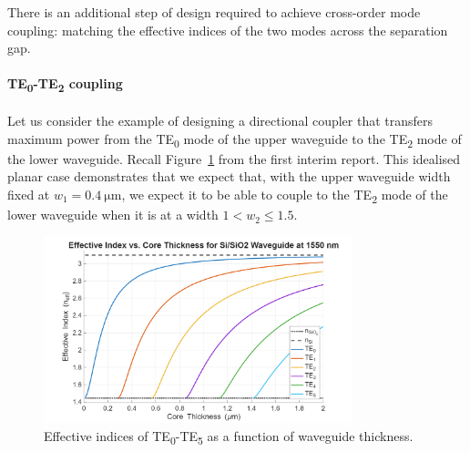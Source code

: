 \documentclass[10pt, a4paper]{article}
\begin{document}

There is an additional step of design required to achieve cross-order mode coupling:
matching the effective indices of the two modes across the separation gap.

\paragraph{TE\textsubscript{0}-TE\textsubscript{2} coupling}
Let us consider the example of designing a directional coupler that transfers maximum power from the TE\textsubscript{0} mode of the upper waveguide to the TE\textsubscript{2} mode of the lower waveguide. 
Recall Figure~\ref{fig:te_neff} from the first interim report\autocite{ngSB4IntegratedPhotonics2025}.
This idealised planar case demonstrates that we expect that,
with the upper waveguide width fixed at \(w_1=\SI{0.4}{\um}\),
we expect it to be able to couple to the TE\textsubscript{2} mode of the lower waveguide when it is at a width \(1< w_2\leq 1.5\).

\begin{figure}[h!]
  \centering
  \includegraphics[width=0.8\textwidth]{task1/neff_vs_thickness_Si_SiO2_1550nm.png}
  \caption{Effective indices of TE\textsubscript{0}-TE\textsubscript{5} as a function of waveguide thickness.}
  \label{fig:te_neff}
\end{figure}
\end{document}
